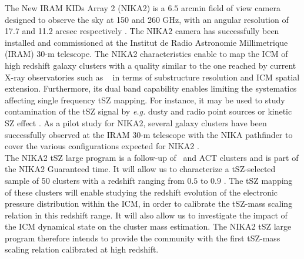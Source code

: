 \documentclass[traditabstract]{aa}
\begin{document}
\indent The New IRAM KIDs Array 2 (NIKA2) is a $6.5$ arcmin field of view camera designed to observe the sky at 150 and 260 GHz, with an angular resolution of 17.7 and 11.2 arcsec respectively \citep[see][]{ada17a}. The NIKA2 camera has successfully been installed and commissioned at the Institut de Radio Astronomie Millimetrique (IRAM) 30-m telescope. The NIKA2 characteristics enable to map the ICM of high redshift galaxy clusters with a quality similar to the one reached by current X-ray observatories such as \xmm\ \citep[\emph{e.g.,}][]{boe07} in terms of substructure resolution and ICM spatial extension. Furthermore, its dual band capability enables limiting the systematics affecting single frequency tSZ mapping. For instance, it may be used to study contamination of the tSZ signal by \emph{e.g.} dusty and radio point sources or kinetic SZ effect \citep[see][]{ada16a,ada17b}. As a pilot study for NIKA2, several galaxy clusters have been successfully observed at the IRAM 30-m telescope with the NIKA pathfinder \citep{mon10,cat14} to cover the various configurations expected for NIKA2 \citep[see][]{ada14,ada15,ada16a,ada17b,ada17c,rup17,rom17}.\\
\indent The NIKA2 tSZ large program is a follow-up of \planck\ and ACT clusters and is part of the NIKA2 Guaranteed time. It will allow us to characterize a tSZ-selected sample of 50 clusters with a redshift ranging from $0.5$ to $0.9$ \citep{com16}. The tSZ mapping of these clusters will enable studying the redshift evolution of the electronic pressure distribution within the ICM, in order to calibrate the tSZ-mass scaling relation in this redshift range. It will also allow us to investigate the impact of the ICM dynamical state on the cluster mass estimation. The NIKA2 tSZ large program therefore intends to provide the community with the first tSZ-mass scaling relation calibrated at high redshift.\\
\end{document}
